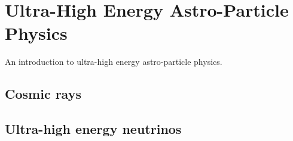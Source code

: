 \chapter{Ultra-High Energy Astro-Particle Physics}
\label{chap:uhe-app}

An introduction to ultra-high energy astro-particle physics.

\section{Cosmic rays}

\section{Ultra-high energy neutrinos}

